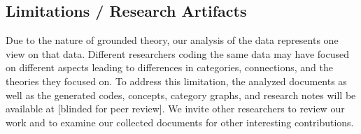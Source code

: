 \subsection{Limitations / Research Artifacts}
Due to the nature of grounded theory, our analysis of the data represents one view on that data.
Different researchers coding the same data may have focused on different aspects leading to differences in categories, connections, and the theories they focused on.
To address this limitation, the analyzed documents as well as the generated codes, concepts, category graphs, and research notes will be available at [blinded for peer review].
We invite other researchers to review our work and to examine our collected documents for other interesting contributions.